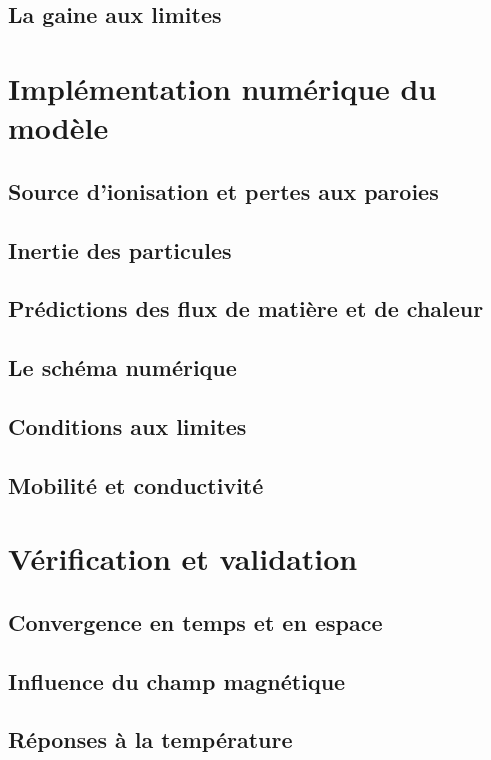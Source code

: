 \subsection{La gaine aux limites}
\section{Implémentation numérique du modèle}
\subsection{Source d'ionisation et pertes aux paroies}
\subsection{Inertie des particules}
\subsection{Prédictions des flux de matière et de chaleur}
\subsection{Le schéma numérique}
\subsection{Conditions aux limites}
\subsection{Mobilité et conductivité}

\section{Vérification et validation}
\subsection{Convergence en temps et en espace}
\subsection{Influence du champ magnétique}
\subsection{Réponses à la température}


